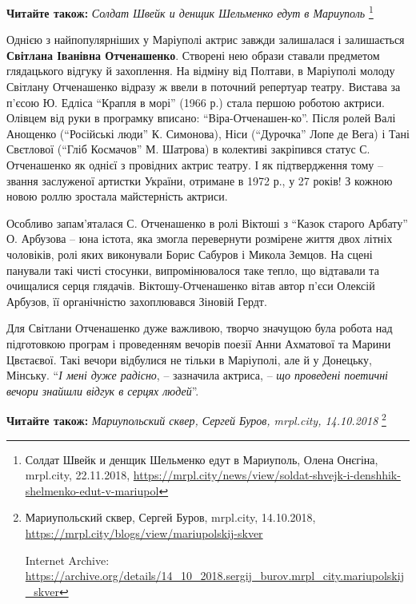\textbf{Читайте також:} \emph{Солдат Швейк и денщик Шельменко едут в Мариуполь}%
\footnote{Солдат Швейк и денщик Шельменко едут в Мариуполь, Олена Онєгіна, mrpl.city, 22.11.2018, \url{https://mrpl.city/news/view/soldat-shvejk-i-denshhik-shelmenko-edut-v-mariupol}}

Однією з найпопулярніших у Маріуполі актрис завжди залишалася і залишається
\textbf{Світлана Іванівна Отченашенко}. Створені нею образи ставали предметом
глядацького відгуку й захоплення. На відміну від Полтави, в Маріуполі молоду
Світлану Отченашенко відразу ж ввели в поточний репертуар театру. Вистава за
п'єсою Ю. Едліса \enquote{Крапля в морі} (1966 р.) стала першою роботою актриси.
Олівцем від руки в програмку вписано: \enquote{Віра-Отченашен\hyp{}ко}. Після ролей Валі
Анощенко (\enquote{Російські люди} К. Симонова), Ніси (\enquote{Дурочка} Лопе де Вега) і Тані
Свєтлової (\enquote{Гліб Космачов} М. Шатрова) в колективі закріпився статус С.
Отченашенко як однієї з провідних актрис театру. І як підтвердження тому –
звання заслуженої артистки України, отримане в 1972 р., у 27 років! З кожною
новою роллю зростала майстерність актриси. 


Особливо запам'яталася С. Отченашенко в ролі Віктоші з \enquote{Казок старого
Арбату} О. Арбузова – юна істота, яка змогла перевернути розмірене життя двох
літніх чоловіків, ролі яких виконували Борис Сабуров і Микола Земцов. На сцені
панували такі чисті стосунки, випромінювалося таке тепло, що відтавали та
очищалися серця глядачів.  Віктошу-Отченашенко вітав автор п'єси Олексій
Арбузов, її органічністю захоплювався Зіновій Гердт.

Для Світлани Отченашенко дуже важливою, творчо значущою була робота над
підготовкою програм і проведенням вечорів поезії Анни Ахматової та Марини
Цвєтаєвої. Такі вечори відбулися не тільки в Маріуполі, але й у Донецьку,
Мінську. \enquote{\emph{І мені дуже радісно}, – зазначила актриса, – \emph{що проведені поетичні
вечори знайшли відгук в серцях людей}}.

\textbf{Читайте також:} \emph{Мариупольский сквер, Сергей Буров, mrpl.city, 14.10.2018}%
\footnote{Мариупольский сквер, Сергей Буров, mrpl.city, 14.10.2018, \url{https://mrpl.city/blogs/view/mariupolskij-skver}\par%
Internet Archive: \url{https://archive.org/details/14_10_2018.sergij_burov.mrpl_city.mariupolskij_skver}
}

